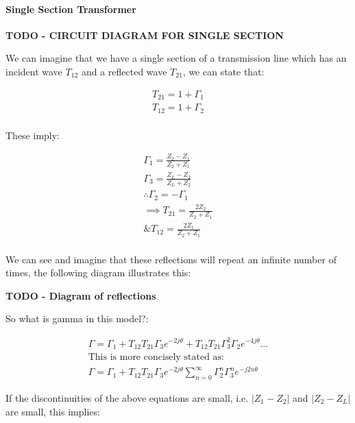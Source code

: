 \documentclass[colorlinks,11pt,a4paper,normalphoto,withhyper,ragged2e]{altareport}
\begin{document}
\paragraph{Single Section Transformer}

\textbf{TODO - CIRCUIT DIAGRAM FOR SINGLE SECTION} \linebreak

We can imagine that we have a single section of a transmission line which has an incident wave $T_{12}$ and a reflected wave $T_{21}$, we can state that: \linebreak

\begin{align*}
	T_{21} = 1 + \Gamma_1 \\
	T_{12} = 1+ \Gamma_2 \\
\end{align*}

These imply: \linebreak

\begin{gather*}
	\Gamma_1 = \frac{Z_2 - Z_1}{Z_2 + Z_1} \\
	\Gamma_3 = \frac{Z_L - Z_2}{Z_L + Z_2} \\
	\therefore \Gamma_2 = -\Gamma_1 \\
	\implies T_{21} = \frac{2Z_2}{Z_2 + Z_1} \\
	\& T_{12} = \frac{2Z_1}{Z_2 + Z_1} \\
\end{gather*}

We can see and imagine that these reflections will repeat an infinite number of times, the following diagram illustrates this: \linebreak

\textbf{TODO - Diagram of reflections} \linebreak

So what is gamma in this model?: \linebreak

\begin{gather*}
	\Gamma = \Gamma_1 + T_{12} T_{21} \Gamma_3 e^{-2j\theta} + T_{12} T_{21} \Gamma_3^2 \Gamma_2 e^{-4j\theta} \dots \\
	\text{This is more concisely stated as:} \\
	\Gamma = \Gamma_1 + T_{12} T_{21} \Gamma_3 e^{-2j\theta} \displaystyle\sum_{n=0}^{\infty} \Gamma_2^n \Gamma_3^n e ^{-j2n\theta }
\end{gather*}


If the discontinuities of the above equations are small, i.e. $|Z_1 - Z_2|$ and $|Z_2 - Z_L|$ are small, this implies: \linebreak
\end{document}
